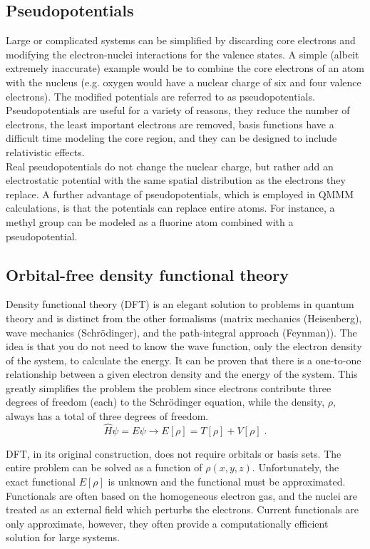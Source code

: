 \documentclass[12pt]{report}
\begin{document}
\subsection{Pseudopotentials}

Large or complicated systems can be simplified by discarding core electrons
and modifying the electron-nuclei interactions for the valence states. A
simple (albeit extremely inaccurate) example would be to combine the core
electrons of an atom with the nucleus (e.g. oxygen would have a nuclear charge
of six and four valence electrons). The modified potentials are referred to as
pseudopotentials. Pseudopotentials are useful for a variety of reasons, they
reduce the number of electrons, the least important electrons are removed,
basis functions have a difficult time modeling the core region, and they can
be designed to include relativistic effects. \\

Real pseudopotentials do not change the nuclear charge, but rather add an
electrostatic potential with the same spatial distribution as the electrons
they replace. A further advantage of pseudopotentials, which is employed in
QMMM calculations, is that the potentials can replace entire atoms. For
instance, a methyl group can be modeled as a fluorine atom combined with a
pseudopotential.

\subsection{Orbital-free density functional theory}

Density functional theory (DFT) is an elegant solution to problems in quantum
theory and is distinct from the other formalisms (matrix mechanics
(Heisenberg), wave mechanics (Schr\"{o}dinger), and the path-integral approach
(Feynman)). The idea is that you do not need to know the wave function, only
the electron density of the system, to calculate the energy. It can be proven
that there is a one-to-one relationship between a given electron density and
the energy of the system. This greatly simplifies the problem the problem
since electrons contribute three degrees of freedom (each) to the
Schr\"{o}dinger equation, while the density, $\rho$, always has a total of
three degrees of freedom.
\begin{equation}
 \hat H\psi=E\psi \to E[\rho] = T[\rho]+V[\rho] \; .
\end{equation}

DFT, in its original construction, does not require orbitals or basis sets.
The entire problem can be solved as a function of $\rho(x,y,z)$.
Unfortunately, the exact functional $E[\rho]$ is unknown and the functional
must be approximated. Functionals are often based on the homogeneous electron
gas, and the nuclei are treated as an external field which perturbs the
electrons. Current functionals are only approximate, however, they often
provide a computationally efficient solution for large systems. \\
\end{document}
